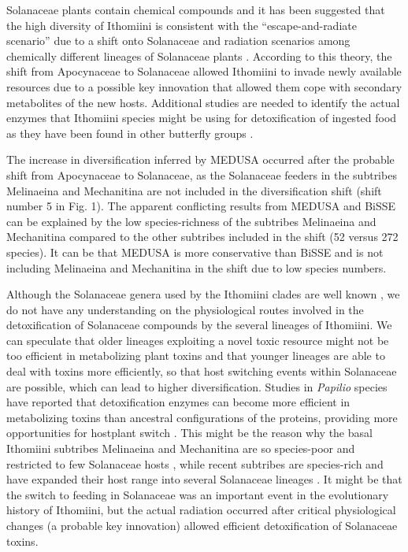 \documentclass[10pt]{article}
\begin{document}
Solanaceae plants contain chemical compounds and it has been suggested
that the high diversity of Ithomiini is consistent with the
``escape-and-radiate scenario'' due to a shift onto Solanaceae
\cite{fordyce2010}
and radiation scenarios among chemically different lineages of
Solanaceae plants \cite{willmott2006, brown1987}. According to this theory, the shift from
Apocynaceae to Solanaceae allowed Ithomiini to invade newly available
resources due to a possible key innovation that allowed them cope with
secondary metabolites of the new hosts. Additional studies are needed to
identify the actual enzymes that Ithomiini species might be using for
detoxification of ingested food as they have been found in other
butterfly groups \cite{wheat2007}.

The increase in diversification inferred by MEDUSA occurred after the
probable shift from Apocynaceae to Solanaceae, as the Solanaceae feeders
in the subtribes Melinaeina and Mechanitina are not included in the
diversification shift (shift number 5 in Fig. 1). The apparent
conflicting results from MEDUSA and BiSSE can be explained by the low
species-richness of the subtribes Melinaeina and Mechanitina compared to
the other subtribes included in the shift (52 versus 272 species). It
can be that MEDUSA is more conservative than BiSSE and is not including
Melinaeina and Mechanitina in the shift due to low species numbers.

Although the Solanaceae genera used by the Ithomiini clades are well
known \cite{willmott2006}, we do not have any understanding on the physiological
routes involved in the detoxification of Solanaceae compounds by the
several lineages of Ithomiini. We can speculate that older lineages
exploiting a novel toxic resource \cite{willmott2006, wahlberg2009} might not be too efficient
in metabolizing plant toxins and that younger lineages are able to deal
with toxins more efficiently, so that host switching events within
Solanaceae are possible, which can lead to higher diversification.
Studies in \emph{Papilio} species have reported that detoxification
enzymes can become more efficient in metabolizing toxins than ancestral
configurations of the proteins, providing more opportunities for
hostplant switch \cite{li2003}. This might be the reason why the basal
Ithomiini subtribes Melinaeina and Mechanitina are so species-poor and
restricted to few Solanaceae hosts \cite{willmott2006}, while recent subtribes are
species-rich and have expanded their host range into several Solanaceae
lineages \cite{willmott2006}. It might be that the switch to feeding in Solanaceae
was an important event in the evolutionary history of Ithomiini, but the
actual radiation occurred after critical physiological changes (a
probable key innovation) allowed efficient detoxification of Solanaceae
toxins.
\end{document}

